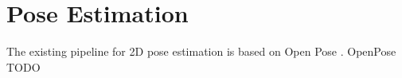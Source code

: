 \section{Pose Estimation}
The existing pipeline for 2D pose estimation is based on Open Pose \cite{openPose}. OpenPose TODO
